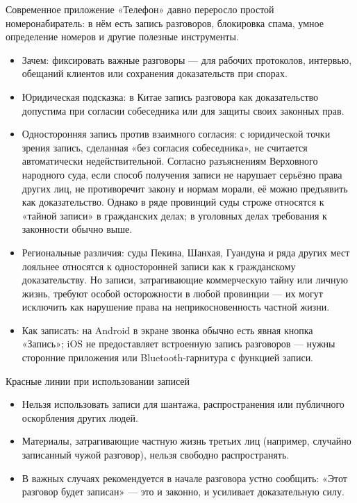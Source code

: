 


Современное приложение «Телефон» давно переросло простой номеронабиратель: в нём есть запись разговоров, блокировка спама, умное определение номеров и другие полезные инструменты.


\begin{itemize}
  \item Зачем: фиксировать важные разговоры — для рабочих протоколов, интервью, обещаний клиентов или сохранения доказательств при спорах.
  \item Юридическая подсказка: в Китае запись разговора как доказательство допустима при согласии собеседника или для защиты своих законных прав.
  \item Односторонняя запись против взаимного согласия: с юридической точки зрения запись, сделанная «без согласия собеседника», не считается автоматически недействительной. Согласно разъяснениям Верховного народного суда, если способ получения записи не нарушает серьёзно права других лиц, не противоречит закону и нормам морали, её можно предъявить как доказательство. Однако в ряде провинций суды строже относятся к «тайной записи» в гражданских делах; в уголовных делах требования к законности обычно выше.
  \item Региональные различия: суды Пекина, Шанхая, Гуандуна и ряда других мест лояльнее относятся к односторонней записи как к гражданскому доказательству. Но записи, затрагивающие коммерческую тайну или личную жизнь, требуют особой осторожности в любой провинции — их могут исключить как нарушение права на неприкосновенность частной жизни.
  \item Как записать: на Android в экране звонка обычно есть явная кнопка «Запись»; iOS не предоставляет встроенную запись разговоров — нужны сторонние приложения или Bluetooth-гарнитура с функцией записи.
\end{itemize}

\begin{tcbwarn}{Красные линии при использовании записей}
\begin{itemize}
  \item Нельзя использовать записи для шантажа, распространения или публичного оскорбления других людей.
  \item Материалы, затрагивающие частную жизнь третьих лиц (например, случайно записанный чужой разговор), нельзя свободно распространять.
  \item В важных случаях рекомендуется в начале разговора устно сообщить: «Этот разговор будет записан» — это и законно, и усиливает доказательную силу.
\end{itemize}

\end{tcbwarn}

